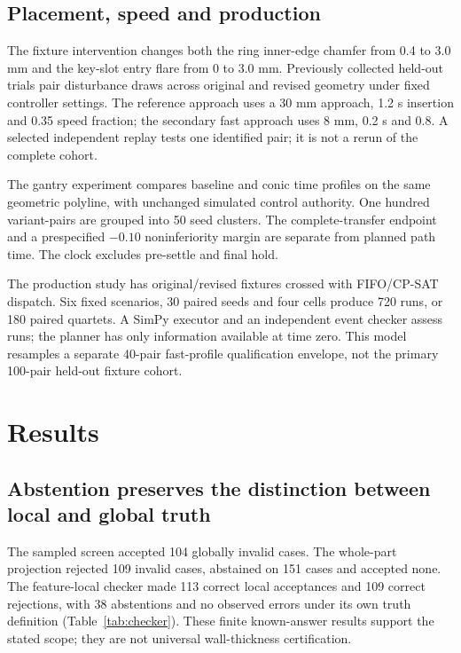 \subsection{Placement, speed and production}
The fixture intervention changes both the ring inner-edge chamfer from 0.4 to 3.0 mm and the key-slot entry flare from 0 to 3.0 mm. Previously collected held-out trials pair disturbance draws across original and revised geometry under fixed controller settings. The reference approach uses a 30 mm approach, 1.2 s insertion and 0.35 speed fraction; the secondary fast approach uses 8 mm, 0.2 s and 0.8. A selected independent replay tests one identified pair; it is not a rerun of the complete cohort.

The gantry experiment compares baseline and conic time profiles on the same geometric polyline, with unchanged simulated control authority. One hundred variant-pairs are grouped into 50 seed clusters. The complete-transfer endpoint and a prespecified $-0.10$ noninferiority margin are separate from planned path time. The clock excludes pre-settle and final hold.

The production study has original/revised fixtures crossed with FIFO/CP-SAT dispatch. Six fixed scenarios, 30 paired seeds and four cells produce 720 runs, or 180 paired quartets. A SimPy executor and an independent event checker assess runs; the planner has only information available at time zero. This model resamples a separate 40-pair fast-profile qualification envelope, not the primary 100-pair held-out fixture cohort.

\section{Results}
\subsection{Abstention preserves the distinction between local and global truth}
\begin{table}[tb]
\centering\small
\caption{Geometry outcomes over 260 cases. CA/CR: correct acceptance/rejection; FA/FR: false acceptance/rejection; U: abstention. Feature-local and global truth are different predicates. Counts do not establish equal-scope superiority of the local checker.}
\label{tab:checker}
\end{table}
The sampled screen accepted 104 globally invalid cases. The whole-part projection rejected 109 invalid cases, abstained on 151 cases and accepted none. The feature-local checker made 113 correct local acceptances and 109 correct rejections, with 38 abstentions and no observed errors under its own truth definition (Table~\ref{tab:checker}). These finite known-answer results support the stated scope; they are not universal wall-thickness certification.

